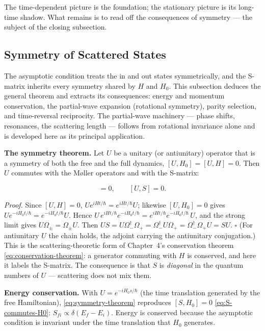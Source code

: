 The time-dependent picture is the foundation; the stationary picture is its long-time shadow. What remains is to read off the consequences of symmetry --- the subject of the closing subsection.

\subsection{Symmetry of Scattered States}
\label{sec:scattering-symmetry}

The asymptotic condition treats the in and out states symmetrically, and the S-matrix inherits every symmetry shared by $H$ and $H_{0}$. This subsection deduces the general theorem and extracts its consequences: energy and momentum conservation, the partial-wave expansion (rotational symmetry), parity selection, and time-reversal reciprocity. The partial-wave machinery --- phase shifts, resonances, the scattering length --- follows from rotational invariance alone and is developed here as its principal application.

\medskip\noindent\textbf{The symmetry theorem.} Let $U$ be a unitary (or antiunitary) operator that is a symmetry of both the free and the full dynamics, $[U,H_{0}]=[U,H]=0$. Then $U$ commutes with the M\o{}ller operators and with the S-matrix:
\begin{linenomath}
\begin{equation}
[U,\Omega_{\pm}]=0,\qquad [U,S]=0.
\label{eq:symmetry-theorem}
\end{equation}
\end{linenomath}
\emph{Proof.} Since $[U,H]=0$, $Ue^{iHt/\hbar}=e^{iHt/\hbar}U$; likewise $[U,H_{0}]=0$ gives $Ue^{-iH_{0}t/\hbar}=e^{-iH_{0}t/\hbar}U$. Hence $U\,e^{iHt/\hbar}e^{-iH_{0}t/\hbar}=e^{iHt/\hbar}e^{-iH_{0}t/\hbar}\,U$, and the strong limit gives $U\Omega_{\pm}=\Omega_{\pm}U$. Then $US=U\Omega_{-}^{\dagger}\Omega_{+}=\Omega_{-}^{\dagger}U\Omega_{+}=\Omega_{-}^{\dagger}\Omega_{+}U=SU$. $\square$ (For antiunitary $U$ the chain holds, the adjoint carrying the antiunitary conjugation.) This is the scattering-theoretic form of Chapter~4's conservation theorem \eqref{eq:conservation-theorem}: a generator commuting with $H$ is conserved, and here it labels the S-matrix. The consequence is that $S$ is \emph{diagonal} in the quantum numbers of $U$ --- scattering does not mix them.

\medskip\noindent\textbf{Energy conservation.} With $U=e^{-iH_{0}s/\hbar}$ (the time translation generated by the free Hamiltonian), \eqref{eq:symmetry-theorem} reproduces $[S,H_{0}]=0$ \eqref{eq:S-commutes-H0}: $S_{fi}\propto\delta(E_{f}-E_{i})$. Energy is conserved because the asymptotic condition is invariant under the time translation that $H_{0}$ generates.

